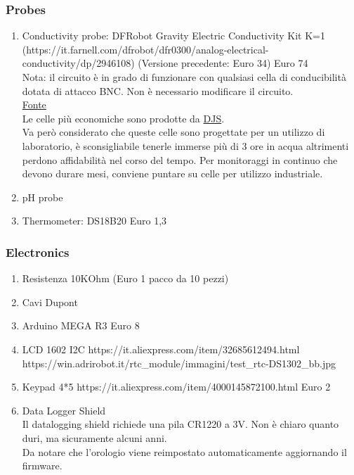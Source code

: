 \documentclass[]{article}
\begin{document}
\subsubsection{Probes}
\begin{enumerate}
\item {Conductivity probe: DFRobot Gravity Electric Conductivity Kit K=1 \\(https://it.farnell.com/dfrobot/dfr0300/analog-electrical-conductivity/dp/2946108) (Versione precedente: Euro 34)  Euro 74 \\ Nota: il circuito è in grado di funzionare con qualsiasi cella di conducibilità dotata di attacco BNC. Non è necessario modificare il circuito. \\ \href{https://www.dfrobot.com/product-1797.html\#comment-4508952573}{Fonte} \\ Le celle più economiche sono prodotte da \href{http://web.archive.org/web/20200406124240im_/http://www.sinotester.com/Uploads/image/20180115/20180115084843_34419.jpg}{DJS}.
\\ Va però considerato che queste celle sono progettate per un utilizzo di laboratorio, è sconsigliabile tenerle immerse più di 3 ore in acqua altrimenti perdono affidabilità nel corso del tempo. Per monitoraggi in continuo che devono durare mesi, conviene puntare su celle per utilizzo industriale.}
\item {pH probe}
\item {Thermometer: DS18B20 Euro 1,3}
\end{enumerate}

\subsubsection{Electronics}
\begin{enumerate}
\item {Resistenza 10KOhm (Euro 1 pacco da 10 pezzi)}
\item {Cavi Dupont}
\item {Arduino MEGA R3 Euro 8}
\item {LCD 1602 I2C https://it.aliexpress.com/item/32685612494.html \\ https://win.adrirobot.it/rtc\_module/immagini/test\_rtc-DS1302\_bb.jpg}
\item {Keypad 4*5 https://it.aliexpress.com/item/4000145872100.html Euro 2}
\item {Data Logger Shield \\ Il datalogging shield richiede una pila CR1220 a 3V. Non è chiaro quanto duri, ma sicuramente alcuni anni.\\
Da notare che l'orologio viene reimpostato automaticamente aggiornando il firmware.}
\end{enumerate}
\end{document}
